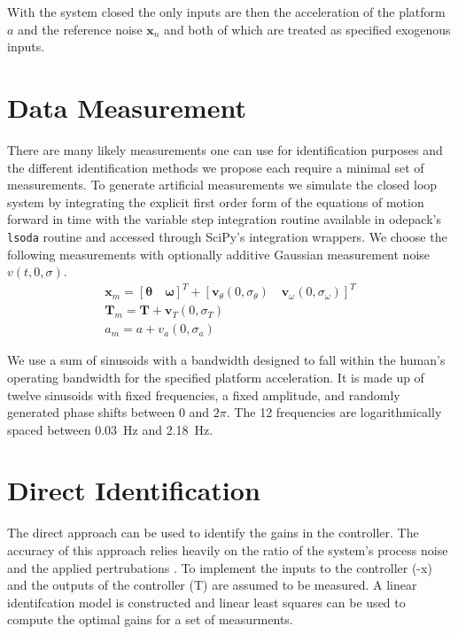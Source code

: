 \documentclass{article}
\begin{document}
With the system closed the only inputs are then the acceleration of the
platform $a$ and the reference noise $\mathbf{x}_n$ and both of which are
treated as specified exogenous inputs.

\section{Data Measurement}
%
There are many likely measurements one can use for identification purposes and
the different identification methods we propose each require a minimal set of
measurements. To generate artificial measurements we simulate the closed loop
system by integrating the explicit first order form of the equations of motion
forward in time with the variable step integration routine available in
odepack's \verb|lsoda| routine and accessed through SciPy's integration
wrappers. We choose the following measurements with optionally additive
Gaussian measurement noise $v(t, 0, \sigma)$.
%
\begin{align}
  \mathbf{x}_m = \left[ \mathbf{\theta} \quad \mathbf{\omega} \right]^T +
    \left[\mathbf{v}_{\theta}(0, \sigma_\theta) \quad \mathbf{v}_{\omega}(0,
    \sigma_\omega)\right]^T \\
  \mathbf{T}_m = \mathbf{T} + \mathbf{v}_T(0, \sigma_T) \\
  a_m = a + v_a(0, \sigma_a)
\end{align}

We use a sum of sinusoids with a bandwidth designed to fall within the human's
operating bandwidth for the specified platform acceleration. It is made up of
twelve sinusoids with fixed frequencies, a fixed amplitude, and randomly
generated phase shifts between $0$ and $2\pi$. The 12 frequencies are
logarithmically spaced between 0.03~\si{\hertz} and 2.18~\si{\hertz}.


\section{Direct Identification}

The direct approach can be used to identify the gains in the controller. The
accuracy of this approach relies heavily on the ratio of the system's process
noise and the applied pertrubations \cite{Kooij2005}. To implement the inputs
to the controller (-x) and the outputs of the controller (T) are assumed to be
measured. A linear identifcation model is constructed and linear least squares
can be used to compute the optimal gains for a set of measurments.
\end{document}

